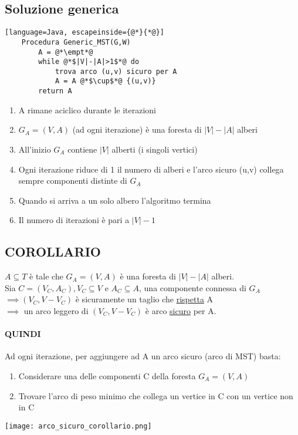 \subsection{Soluzione generica}
\begin{lstlisting}[language=Java, escapeinside={@*}{*@}]
    Procedura Generic_MST(G,W)
        A = @*\empt*@
        while @*$|V|-|A|>1$*@ do
            trova arco (u,v) sicuro per A
            A = A @*$\cup$*@ {(u,v)}
        return A
\end{lstlisting}
\begin{enumerate}
    \item A rimane aciclico durante le iterazioni
    \item $G_A = (V,A)$ (ad ogni iterazione) è una foresta di $|V|-|A|$ alberi
    \item All'inizio $G_A$ contiene $|V|$ alberti (i singoli vertici)
    \item Ogni iterazione riduce di 1 il numero di alberi e l'arco sicuro (u,v) collega
    sempre componenti distinte di $G_A$
    \item Quando si arriva a un solo albero l'algoritmo termina
    \item Il numero di iterazioni è pari a $|V|-1$
\end{enumerate}
\subsection{COROLLARIO}
$A\subseteq T$ è tale che $G_A = (V,A)$ è una foresta di $|V|-|A|$ alberi.\\
Sia $C= (V_C, A_C), V_C \subseteq V$ e $A_C \subseteq A$, una componente connessa di $G_A$\\
$\implies (V_C, V-V_C)$ è sicuramente un taglio che \underline{rispetta} A\\
$\implies$ un arco leggero di $(V_C, V-V_C)$ è arco \underline{sicuro} per A.
\paragraph*{QUINDI} Ad ogni iterazione, per aggiungere ad A un arco sicuro (arco di MST) basta:
\begin{enumerate}
    \item Considerare una delle componenti C della foresta $G_A = (V,A)$
    \item Trovare l'arco di peso minimo che collega un vertice in C con un vertice non in C
\end{enumerate}
\begin{center}
    \texttt{[image: arco\_sicuro\_corollario.png]}
\end{center}
